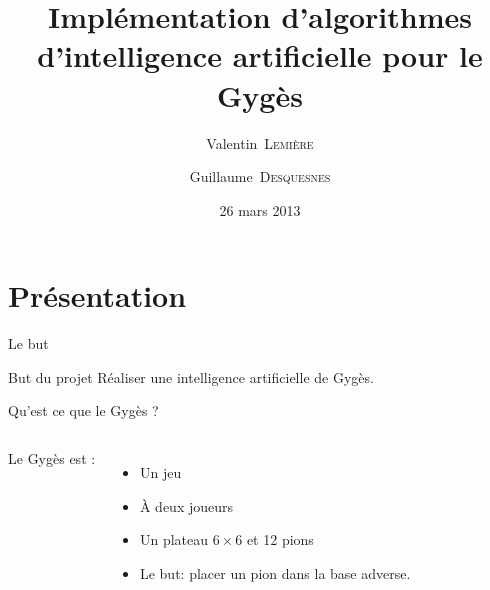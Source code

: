 \documentclass{beamer}
\title[Intelligence artificielle pour le Gygès]
{%
	Implémentation d’algorithmes d’intelligence artificielle pour le Gygès
}
\author{Valentin~\textsc{Lemière} \and Guillaume~\textsc{Desquesnes}}
\date{26 mars 2013}
\begin{document}
	\frame{\titlepage}

	\section{Présentation}

	\begin{frame}{Le but}
		\begin{block}{But du projet}
			\vspace{0.75em}
			Réaliser une \alert{intelligence artificielle} de Gygès.
			\vspace{0.75em}
		\end{block}
	\end{frame}

	\begin{frame}{Qu’est ce que le Gygès ?}
		\begin{columns}
				Le Gygès est :
				\vspace{1em}
				\begin{itemize}
					\item<2-> Un jeu
					\vspace{0.75em}
					\item<3-> \`A deux joueurs
					\vspace{0.75em}
					\item<4-> Un plateau $6\times{}6$ et 12 pions
					\vspace{0.75em}
					\item<5-> Le but: placer un pion dans la base adverse.
				\end{itemize}


\end{columns}
\end{frame}
\end{document}
